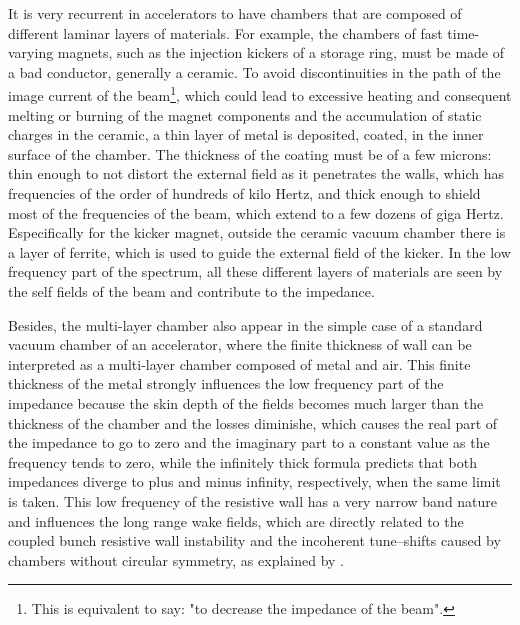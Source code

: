     It is very recurrent in accelerators to have chambers that are composed of different laminar layers of materials. For example, the chambers of fast time-varying magnets, such as the injection kickers of a storage ring, must be made of a bad conductor, generally a ceramic. To avoid discontinuities in the path of the image current of the beam\footnote{This is equivalent to say: "to decrease the impedance of the beam".}, which could lead to excessive heating and consequent melting or burning of the magnet components and the accumulation of static charges in the ceramic, a thin layer of metal is deposited, coated, in the inner surface of the chamber. The thickness of the coating must be of a few microns: thin enough to not distort the external field as it penetrates the walls, which has frequencies of the order of hundreds of kilo Hertz, and thick enough to shield most of the frequencies of the beam, which extend to a few dozens of giga Hertz. Especifically for the kicker magnet, outside the ceramic vacuum chamber there is a layer of ferrite, which is used to guide the external field of the kicker. In the low frequency part of the spectrum, all these different layers of materials are seen by the self fields of the beam and contribute to the impedance.

    Besides, the multi-layer chamber also appear in the simple case of a standard vacuum chamber of an accelerator, where the finite thickness of wall can be interpreted as a multi-layer chamber composed of metal and air. This finite thickness of the metal strongly influences the low frequency part of the impedance because the skin depth of the fields becomes much larger than the thickness of the chamber and the losses diminishe, which causes the real part of the impedance to go to zero and the imaginary part to a constant value as the frequency tends to zero, while the infinitely thick formula predicts that both impedances diverge to plus and minus infinity, respectively, when the same limit is taken. This low frequency of the resistive wall has a very narrow band nature and influences the long range wake fields, which are directly related to the coupled bunch resistive wall instability and the incoherent tune--shifts caused by chambers without circular symmetry, as explained by .

